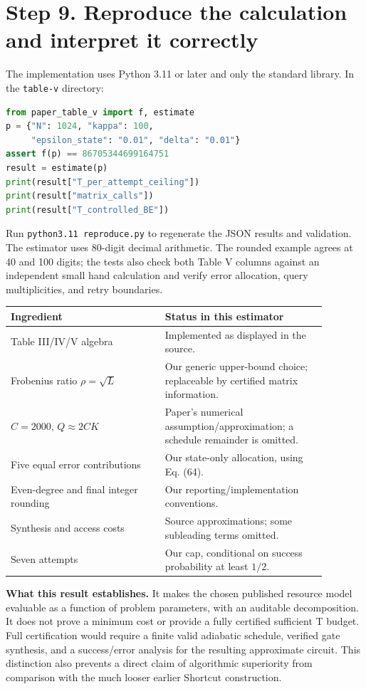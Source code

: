 \documentclass[11pt]{article}
\begin{document}
\newpage
\section*{Step 9. Reproduce the calculation and interpret it correctly}
The implementation uses Python 3.11 or later and only the standard library. In the \texttt{table-v} directory:
\begin{lstlisting}[language=Python]
from paper_table_v import f, estimate
p = {"N": 1024, "kappa": 100,
     "epsilon_state": "0.01", "delta": "0.01"}
assert f(p) == 86705344699164751
result = estimate(p)
print(result["T_per_attempt_ceiling"])
print(result["matrix_calls"])
print(result["T_controlled_BE"])
\end{lstlisting}
Run \texttt{python3.11 reproduce.py} to regenerate the JSON results and validation. The estimator uses 80-digit decimal arithmetic. The rounded example agrees at 40 and 100 digits; the tests also check both Table V columns against an independent small hand calculation and verify error allocation, query multiplicities, and retry boundaries.

\begin{center}\small
\begin{tabular}{p{0.43\linewidth}p{0.45\linewidth}}
\toprule
Ingredient & Status in this estimator\\\midrule
Table III/IV/V algebra & Implemented as displayed in the source.\\
Frobenius ratio $\rho=\sqrt L$ & Our generic upper-bound choice; replaceable by certified matrix information.\\
$C=2000$, $Q\approx2CK$ & Paper's numerical assumption/approximation; a schedule remainder is omitted.\\
Five equal error contributions & Our state-only allocation, using Eq. (64).\\
Even-degree and final integer rounding & Our reporting/implementation conventions.\\
Synthesis and access costs & Source approximations; some subleading terms omitted.\\
Seven attempts & Our cap, conditional on success probability at least $1/2$.\\
\bottomrule
\end{tabular}
\end{center}
\textbf{What this result establishes.} It makes the chosen published resource model evaluable as a function of problem parameters, with an auditable decomposition. It does not prove a minimum cost or provide a fully certified sufficient T budget. Full certification would require a finite valid adiabatic schedule, verified gate synthesis, and a success/error analysis for the resulting approximate circuit. This distinction also prevents a direct claim of algorithmic superiority from comparison with the much looser earlier Shortcut construction.
\end{document}
